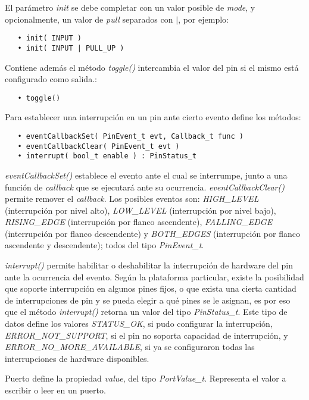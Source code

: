 El parámetro \emph{init} se debe completar con un valor posible de \emph{mode}, y opcionalmente, un valor de \emph{pull} separados con $|$, por ejemplo:

\begin{verbatim}
   • init( INPUT )
   • init( INPUT | PULL_UP )
\end{verbatim}

Contiene además el método \emph{toggle()} intercambia el valor del pin si el mismo está configurado como salida.:

\begin{verbatim}
   • toggle()
\end{verbatim}

Para establecer una interrupción en un pin ante cierto evento define los métodos: 

\begin{verbatim}
   • eventCallbackSet( PinEvent_t evt, Callback_t func )
   • eventCallbackClear( PinEvent_t evt )
   • interrupt( bool_t enable ) : PinStatus_t
 \end{verbatim} 

\emph{eventCallbackSet()} establece el evento ante el cual se interrumpe, junto a una función de \emph{callback} que se ejecutará ante su ocurrencia. \emph{eventCallbackClear()} permite remover el \emph{callback}. Los posibles eventos son: \emph{HIGH\_LEVEL} (interrupción por nivel alto), \emph{LOW\_LEVEL} (interrupción por nivel bajo), \emph{RISING\_EDGE} (interrupción por flanco ascendente), \emph{FALLING\_EDGE} (interrupción por flanco descendente) y \emph{BOTH\_EDGES} (interrupción por flanco ascendente y descendente); todos del tipo \emph{PinEvent\_t}.

\emph{interrupt()} permite habilitar o deshabilitar la interrupción de hardware del pin ante la ocurrencia del evento. Según la plataforma particular, existe la posibilidad que soporte interrupción en algunos pines fijos, o que exista una cierta cantidad de interrupciones de pin y se pueda elegir a qué pines se le asignan, es por eso que el método \emph{interrupt()} retorna un valor del tipo \emph{PinStatus\_t}. Este tipo de datos define los valores \emph{STATUS\_OK}, si pudo configurar la interrupción, \emph{ERROR\_NOT\_SUPPORT}, si el pin no soporta capacidad de interrupción, y \emph{ERROR\_NO\_MORE\_AVAILABLE}, si ya se configuraron todas las interrupciones de hardware disponibles. 


Puerto define la propiedad \emph{value}, del tipo \emph{PortValue\_t}. Representa el valor a escribir o leer en un puerto.

